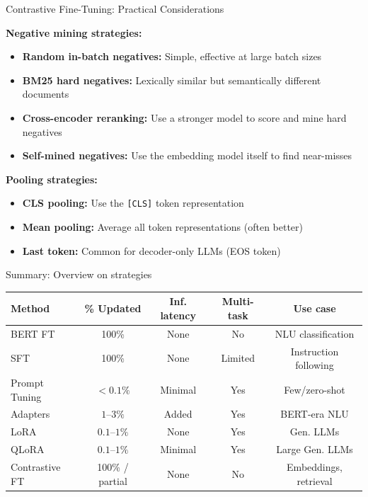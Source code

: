 \documentclass[11pt,compress,t,notes=noshow, xcolor=table]{beamer}
\begin{document}
\begin{frame}{Contrastive Fine-Tuning: Practical Considerations}

\vfill

\textbf{Negative mining strategies:}
\begin{itemize}
  \item \textbf{Random in-batch negatives:} Simple, effective at large batch sizes
  \item \textbf{BM25 hard negatives:} Lexically similar but semantically different documents
  \item \textbf{Cross-encoder reranking:} Use a stronger model to score and mine hard negatives
  \item \textbf{Self-mined negatives:} Use the embedding model itself to find near-misses
\end{itemize}

\vfill

\textbf{Pooling strategies:}
\begin{itemize}
  \item \textbf{CLS pooling:} Use the \texttt{[CLS]} token representation
  \item \textbf{Mean pooling:} Average all token representations (often better)
  \item \textbf{Last token:} Common for decoder-only LLMs (EOS token)
\end{itemize}

\vfill

\end{frame}


\begin{frame}{Summary: Overview on strategies}

\vfill

{\footnotesize
\renewcommand{\arraystretch}{1.4}
\begin{tabular}{lcccc}
\hline
\textbf{Method} & \textbf{\% Updated} & \textbf{Inf. latency} & \textbf{Multi-task} & \textbf{Use case} \\
\hline
BERT FT & 100\% & None & No & NLU classification \\
SFT & 100\% & None & Limited & Instruction following \\
Prompt Tuning & $< 0.1\%$ & Minimal & Yes & Few/zero-shot \\
Adapters & $1$--$3\%$ & Added & Yes & BERT-era NLU \\
LoRA & $0.1$--$1\%$ & None & Yes & Gen. LLMs \\
QLoRA & $0.1$--$1\%$ & Minimal & Yes & Large Gen. LLMs \\
Contrastive FT & 100\% / partial & None & No & Embeddings, retrieval \\
\hline
\end{tabular}
}
\vfill

\end{frame}
\end{document}
